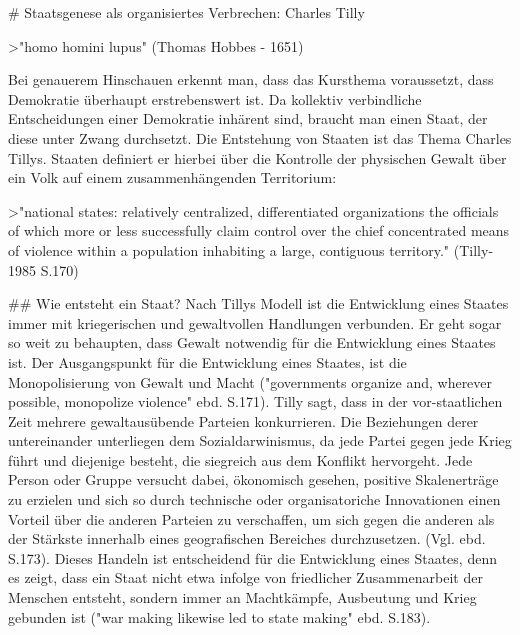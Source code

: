 # Staatsgenese als organisiertes Verbrechen: Charles Tilly

>"homo homini lupus" (Thomas Hobbes - 1651)

Bei genauerem Hinschauen erkennt man, dass das Kursthema voraussetzt, dass Demokratie überhaupt erstrebenswert ist.
Da kollektiv verbindliche Entscheidungen einer Demokratie inhärent sind, braucht man einen Staat, der diese unter Zwang durchsetzt.
Die Entstehung von Staaten ist das Thema Charles Tillys.
Staaten definiert er hierbei über die Kontrolle der physischen Gewalt über ein Volk auf einem zusammenhängenden Territorium:

>"national states: relatively centralized, differentiated organizations the officials of which more or less successfully claim control over the chief concentrated means of violence within a population inhabiting a large, contiguous territory." (Tilly-1985 S.170)

## Wie entsteht ein Staat?
Nach Tillys Modell ist die Entwicklung eines Staates immer mit kriegerischen und gewaltvollen Handlungen verbunden.
Er geht sogar so weit zu behaupten, dass Gewalt notwendig für die Entwicklung eines Staates ist.
Der Ausgangspunkt für die Entwicklung eines Staates, ist die Monopolisierung von Gewalt und Macht ("governments organize and, wherever possible, monopolize violence" ebd. S.171).
Tilly sagt, dass in der vor-staatlichen Zeit mehrere gewaltausübende Parteien konkurrieren.
Die Beziehungen derer untereinander unterliegen dem Sozialdarwinismus, da jede Partei gegen jede Krieg führt und diejenige besteht, die  siegreich aus dem Konflikt hervorgeht. Jede Person oder Gruppe versucht dabei, ökonomisch gesehen, positive Skalenerträge zu erzielen und sich so durch technische oder organisatoriche Innovationen einen Vorteil über die anderen Parteien zu verschaffen, um sich gegen die anderen als der Stärkste innerhalb eines geografischen Bereiches durchzusetzen.  (Vgl. ebd. S.173).
Dieses Handeln ist entscheidend für die Entwicklung eines Staates, denn es zeigt, dass ein Staat nicht etwa infolge von friedlicher Zusammenarbeit der Menschen entsteht, sondern immer an Machtkämpfe, Ausbeutung und Krieg gebunden ist ("war making likewise led to state making" ebd. S.183).

